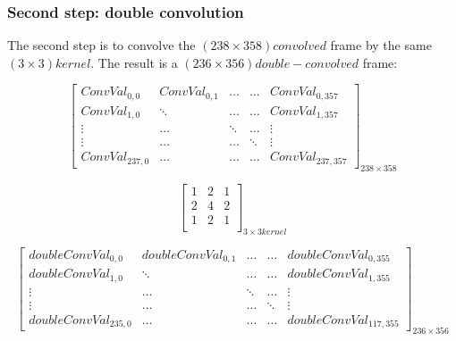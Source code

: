 \vspace{5mm}



\subsubsection{Second step: double convolution}

The second step is to convolve the $(238\times 358) convolved$ frame by the same $(3\times 3) kernel$. The result is a $(236\times 356)double-convolved$ frame:

\vspace{5mm}

\noindent\begin{minipage}{.3\textwidth}
\[
\begin{bmatrix}

ConvVal_{0,0} & ConvVal_{0,1} & \ldots & \ldots & ConvVal_{0,357}\\

ConvVal_{1,0} & \ddots & \ldots & \ldots & ConvVal_{1,357}\\

\vdots & \ldots & \ddots & \ldots & \vdots\\

\vdots & \ldots & \ldots & \ddots & \vdots\\

ConvVal_{237,0} & \ldots & \ldots  & \ldots & ConvVal_{237,357}

\end{bmatrix}_{238\times 358}
\]
\end{minipage}\hfill
\begin{minipage}{.3\textwidth}
\[
\begin{bmatrix}

1 & 2 & 1\\

2 & 4 & 2\\

1 & 2 & 1\\

\end{bmatrix}_{3\times 3 kernel}
\]
\end{minipage}

\vspace{5mm}


\[
\begin{bmatrix}

doubleConvVal_{0,0} & doubleConvVal_{0,1} & \ldots & \ldots & doubleConvVal_{0,355}\\

doubleConvVal_{1,0} & \ddots & \ldots & \ldots & doubleConvVal_{1,355}\\

\vdots & \ldots & \ddots & \ldots & \vdots\\

\vdots & \ldots & \ldots & \ddots & \vdots\\

doubleConvVal_{235,0} & \ldots & \ldots  & \ldots & doubleConvVal_{117,355}

\end{bmatrix}_{236\times 356}
\]

